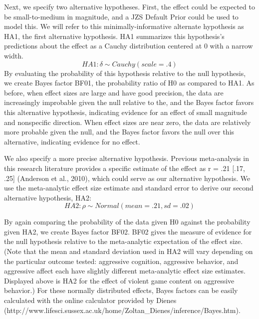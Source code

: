 \documentclass{article}
\begin{document}
Next, we specify two alternative hypotheses. First, the effect could be expected to be small-to-medium in magnitude, and a JZS Default Prior could be used to model this. We will refer to this minimally-informative alternate hypothesis as HA1, the first alternative hypothesis. HA1 summarizes this hypothesis’s predictions about the effect as a Cauchy distribution centered at 0 with a narrow width.
\begin{equation}
HA1: \delta{} \sim{} Cauchy(scale = .4) 
\end{equation}
By evaluating the probability of this hypothesis relative to the null hypothesis, we create Bayes factor BF01, the probability ratio of H0 as compared to HA1. As before, when effect sizes are large and have good precision, the data are increasingly improbable given the null relative to the, and the Bayes factor favors this alternative hypothesis, indicating evidence for an effect of small magnitude and nonspecific direction. When effect sizes are near zero, the data are relatively more probable given the null, and the Bayes factor favors the null over this alternative, indicating evidence for no effect. 

We also specify a more precise alternative hypothesis. Previous meta-analysis in this research literature provides a specific estimate of the effect as r = .21 [.17, .25] (Anderson et al., 2010), which could serve as our alternative hypothesis.  We use the meta-analytic effect size estimate and standard error to derive our second alternative hypothesis, HA2:
\begin{equation}
HA2: \rho{} \sim{} Normal(mean=.21, sd=.02)
\end{equation}

By again comparing the probability of the data given H0 against the probability given HA2, we create Bayes factor BF02. BF02 gives the measure of evidence for the null hypothesis relative to the meta-analytic expectation of the effect size. (Note that the mean and standard deviation used in HA2 will vary depending on the particular outcome tested: aggressive cognition, aggressive behavior, and aggressive affect each have slightly different meta-analytic effect size estimates. Displayed above is HA2 for the effect of violent game content on aggressive behavior.) For these normally distributed effects, Bayes factors can be easily calculated with the online calculator provided by Dienes  (http://www.lifesci.sussex.ac.uk/home/Zoltan\_Dienes/inference/Bayes.htm). %
\end{document}
